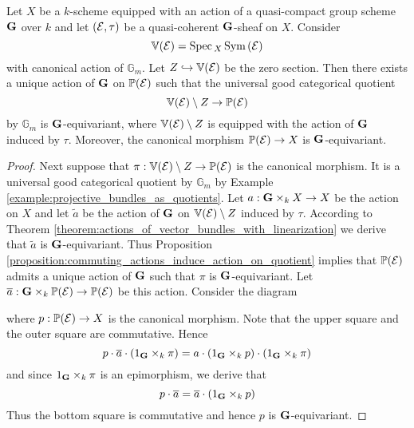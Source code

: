 \begin{corollary}\label{corollary:actions_on_projective_bundles}
Let $X$ be a $k$-scheme equipped with an action of a quasi-compact group scheme $\mathbf{G}$ over $k$ and let $({\mathcal E},\tau)$ be a quasi-coherent $\mathbf{G}$-sheaf on $X$. Consider 
$$\mathbb{V}({\mathcal E}) = \mathrm{Spec}\,_X\,\textrm{Sym}\left({\mathcal E}\right)$$
with canonical action of $\mathbb{G}_m$. Let $Z\hookrightarrow \mathbb{V}({\mathcal E})$ be the zero section. Then there exists a unique action of $\mathbf{G}$ on $\mathbb{P}({\mathcal E})$ such that the universal good categorical quotient 
$$\mathbb{V}({\mathcal E})\setminus Z \rightarrow \mathbb{P}({\mathcal E})$$
by $\mathbb{G}_m$ is $\mathbf{G}$-equivariant, where $\mathbb{V}({\mathcal E})\setminus Z$ is equipped with the action of $\mathbf{G}$ induced by $\tau$. Moreover, the canonical morphism $\mathbb{P}({\mathcal E})\rightarrow X$ is $\mathbf{G}$-equivariant.
\end{corollary}
\begin{proof}
Next suppose that $\pi:\mathbb{V}({\mathcal E})\setminus Z\rightarrow \mathbb{P}({\mathcal E})$ is the canonical morphism. It is a universal good categorical quotient by $\mathbb{G}_m$ by Example \ref{example:projective_bundles_as_quotients}. Let $a:\mathbf{G}\times_kX\rightarrow X$ be the action on $X$ and let $\tilde{a}$ be the action of $\mathbf{G}$ on $\mathbb{V}({\mathcal E})\setminus Z$ induced by $\tau$. According to Theorem \ref{theorem:actions_of_vector_bundles_with_linearization} we derive that $\tilde{a}$ is $\mathbf{G}$-equivariant. Thus Proposition \ref{proposition:commuting_actions_induce_action_on_quotient} implies that $\mathbb{P}({\mathcal E})$ admits a unique action of $\mathbf{G}$ such that $\pi$ is $\mathbf{G}$-equivariant. Let $\overline{a}:\mathbf{G}\times_k\mathbb{P}({\mathcal E})\rightarrow \mathbb{P}({\mathcal E})$ be this action. Consider the diagram
\begin{center}
\end{center}
where $p:\mathbb{P}({\mathcal E})\rightarrow X$ is the canonical morphism. Note that the upper square and the outer square are commutative. Hence
$$p\cdot \overline{a}\cdot \left(1_{\mathbf{G}}\times_k \pi\right) = a\cdot \left(1_{\mathbf{G}}\times_k p\right)\cdot \left(1_{\mathbf{G}}\times_k \pi\right)$$
and since $1_{\mathbf{G}}\times_k\pi$ is an epimorphism, we derive that
$$p\cdot \overline{a} = \overline{a}\cdot \left(1_{\mathbf{G}}\times_k p\right)$$
Thus the bottom square is commutative and hence $p$ is $\mathbf{G}$-equivariant.
\end{proof}

